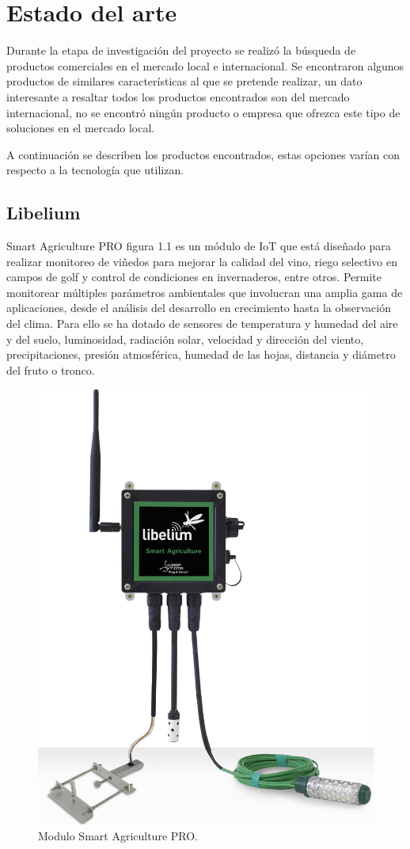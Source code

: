 \section{Estado del arte}

Durante la etapa de investigación del proyecto se realizó la búsqueda de productos comerciales en el mercado local e internacional.
Se encontraron algunos productos de similares características al que se pretende realizar, un dato interesante a resaltar todos los productos encontrados son del mercado internacional, no se encontró ningún producto o empresa que ofrezca este tipo de soluciones
en el mercado local.

A continuación se describen los productos encontrados, estas opciones varían con respecto a la tecnología que utilizan.

\subsection{Libelium}

Smart Agriculture PRO figura 1.1 es un módulo de IoT que está diseñado para realizar monitoreo de viñedos para mejorar la calidad del vino, riego selectivo en campos de golf y control de condiciones en invernaderos, entre otros.
Permite monitorear múltiples parámetros ambientales que involucran una amplia gama de aplicaciones, desde el análisis del desarrollo en crecimiento hasta la observación del clima. Para ello se ha dotado de sensores de temperatura y humedad del aire y del suelo, luminosidad, radiación solar, velocidad y dirección del viento, precipitaciones, presión atmosférica, humedad de las hojas, distancia y diámetro del fruto o tronco\citep{ModuloAgriculture}.
\vspace{1cm}

\begin{figure}[htbp]
	\centering
	\includegraphics[width=.4\textwidth]{./Figures/modulo_libelium.png}
	\caption{Modulo Smart Agriculture PRO.}
	\label{fig:texmaker}
\end{figure}

